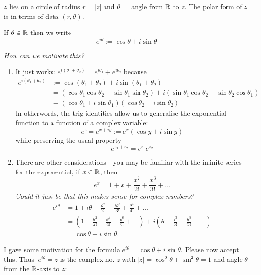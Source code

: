 \documentclass[10pt]{scrartcl}
\begin{document}
$z$ lies on a circle of radius $r = |z|$ and $\theta = $ angle from $\mathbb{R}$ to $z$. The polar form of $z$ is in terms of data $(r,\theta)$. \\

\begin{definition}
 If $\theta \in\mathbb{R}$ then we write 
 \[e^{i\theta} := \cos \theta + i\sin\theta\]
\end{definition}

\emph{How can we motivate this? }

\begin{enumerate}
\item It just works: $e^{i(\theta_1 + \theta_2)} = e^{i\theta_1} + e^{i\theta_2}$ because
\[
\begin{aligned}
  e^{i(\theta_1 + \theta_2)} &:= \cos(\theta_1 + \theta_2) + i\sin(\theta_1 + \theta_2)\\
  &= (\cos\theta_1\cos\theta_2 - \sin\theta_1\sin\theta_2) + i(\sin\theta_1\cos\theta_2 + \sin\theta_2\cos\theta_1)\\
  &= (\cos\theta_1 + i\sin\theta_1)(\cos\theta_2 + i\sin\theta_2)
\end{aligned}
\]
In otherwords, the trig identities allow us to generalise the exponential function to a function of a complex variable: 
\[e^z = e^{x + iy} := e^x (\cos y + i\sin y)\]
while preserving the usual property 
\[e^{z_1 + z_2} = e^{z_1} e^{z_2}\]

\item There are other considerations - you may be familiar with the infinite series for the exponential; if $x \in\mathbb{R}$, then 
\[e^x = 1 + x + \frac{x^2}{2!} + \frac{x^3}{3!} + \dots \]
\emph{Could it just be that this makes sense for complex numbers?}
\[
\begin{aligned}
 e^{i\theta} &= 1 + i\theta - \frac{\theta^2}{2!} - \frac{i\theta^3}{3!} + \frac{\theta^4}{4!} + \dots\\
 &= \left( 1 - \frac{\theta^2}{2!} + \frac{\theta^4}{4!} - \frac{\theta^6}{6!} + \dots\right) + i\left( \theta - \frac{\theta^3}{3!} + \frac{\theta^5}{5!} - \dots\right)\\
 &= \cos\theta + i\sin\theta.
\end{aligned}
\]
\end{enumerate}

I gave some motivation for the formula
$e^{i\theta} = \cos\theta + i\sin\theta$. Please now accept this. Thus, $e^{i\theta} = z$ is the complex no. $z$ with $|z| = \cos^2 \theta + \sin^2\theta = 1$ and angle $\theta$ from the $\mathbb{R}$-axis to $z$: 
\end{document}
